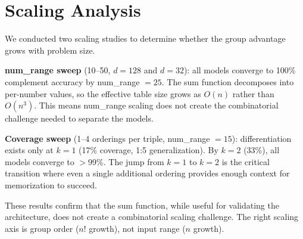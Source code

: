\documentclass[10pt, letterpaper]{article}
\begin{document}
\section{Scaling Analysis}
\label{app:scaling}

We conducted two scaling studies to determine whether the group advantage grows with problem size.

\textbf{num\_range sweep} (10--50, $d = 128$ and $d = 32$): all models converge to 100\% complement accuracy by num\_range $= 25$. The sum function decomposes into per-number values, so the effective table size grows as $O(n)$ rather than $O(n^3)$. This means num\_range scaling does not create the combinatorial challenge needed to separate the models.

\textbf{Coverage sweep} (1--4 orderings per triple, num\_range $= 15$): differentiation exists only at $k = 1$ (17\% coverage, 1:5 generalization). By $k = 2$ (33\%), all models converge to $>$99\%. The jump from $k = 1$ to $k = 2$ is the critical transition where even a single additional ordering provides enough context for memorization to succeed.

These results confirm that the sum function, while useful for validating the architecture, does not create a combinatorial scaling challenge. The right scaling axis is group order ($n!$ growth), not input range ($n$ growth).
\end{document}
